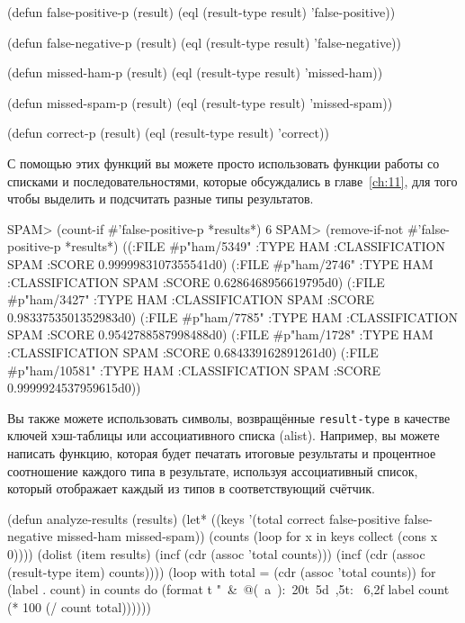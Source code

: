\begin{myverb}
(defun false-positive-p (result)
  (eql (result-type result) 'false-positive))

(defun false-negative-p (result)
  (eql (result-type result) 'false-negative))

(defun missed-ham-p (result)
  (eql (result-type result) 'missed-ham))

(defun missed-spam-p (result)
  (eql (result-type result) 'missed-spam))

(defun correct-p (result)
  (eql (result-type result) 'correct))
\end{myverb}

С помощью этих функций вы можете просто использовать функции работы со списками и
последовательностями, которые обсуждались в главе~\ref{ch:11}, для того чтобы выделить и
подсчитать разные типы результатов.

\begin{myverb}
SPAM> (count-if #'false-positive-p *results*)
6
SPAM> (remove-if-not #'false-positive-p *results*)
((:FILE #p"ham/5349" :TYPE HAM :CLASSIFICATION SPAM :SCORE 0.9999983107355541d0)
 (:FILE #p"ham/2746" :TYPE HAM :CLASSIFICATION SPAM :SCORE 0.6286468956619795d0)
 (:FILE #p"ham/3427" :TYPE HAM :CLASSIFICATION SPAM :SCORE 0.9833753501352983d0)
 (:FILE #p"ham/7785" :TYPE HAM :CLASSIFICATION SPAM :SCORE 0.9542788587998488d0)
 (:FILE #p"ham/1728" :TYPE HAM :CLASSIFICATION SPAM :SCORE 0.684339162891261d0)
 (:FILE #p"ham/10581" :TYPE HAM :CLASSIFICATION SPAM :SCORE 0.9999924537959615d0))
\end{myverb}

Вы также можете использовать символы, возвращённые \lstinline{result-type} в качестве ключей
хэш-таблицы или ассоциативного списка (alist).  Например, вы можете написать функцию,
которая будет печатать итоговые результаты и процентное соотношение каждого типа в
результате, используя ассоциативный список, который отображает каждый из типов в
соответствующий счётчик.

\begin{myverb}
(defun analyze-results (results)
  (let* ((keys '(total correct false-positive 
                 false-negative missed-ham missed-spam))
         (counts (loop for x in keys collect (cons x 0))))
    (dolist (item results)
      (incf (cdr (assoc 'total counts)))
      (incf (cdr (assoc (result-type item) counts))))
    (loop with total = (cdr (assoc 'total counts))
          for (label . count) in counts
          do (format t "~&~@(~a~):~20t~5d~,5t: ~6,2f%
                     label count (* 100 (/ count total))))))
\end{myverb}

